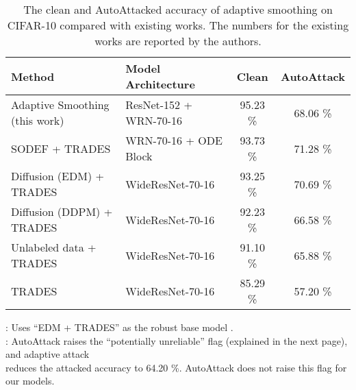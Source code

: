 \documentclass[11pt, letterpaper]{article}
\theoremstyle{plain}
\theoremstyle{definition}
\begin{document}
\begin{table}
\begin{center}
	\caption{The clean and AutoAttacked accuracy of adaptive smoothing on CIFAR-10 compared with existing works. The numbers for the existing works are reported by the authors.}
	\label{tab:compare_cifar10}
	\vspace{-1mm}

	\begin{small}
	\begin{tabular}{l|l!{\vrule width 2pt}c|c}
		\toprule
		Method & Model Architecture & Clean & AutoAttack \\
		\midrule
		Adaptive Smoothing (this work) 		& ResNet-152 + WRN-70-16		& 95.23 \% & 68.06 \% \\
		\midrule
		SODEF + TRADES \citep{Kang21}				& WRN-70-16	+ ODE Block		& 93.73 \% &  71.28 \%  \\
		Diffusion (EDM) + TRADES \citep{Wang23}		& WideResNet-70-16			& 93.25 \% & 70.69 \% \\
		Diffusion (DDPM) + TRADES \citep{Rebuffi21}	& WideResNet-70-16			& 92.23 \% & 66.58 \% \\
		Unlabeled data + TRADES \citep{Gowal20}		& WideResNet-70-16			& 91.10 \% & 65.88 \% \\
		TRADES \citep{Gowal20}						& WideResNet-70-16			& 85.29 \% & 57.20 \% \\
		\bottomrule
	\end{tabular}
	\end{small}
\end{center}
\small{: Uses ``EDM + TRADES'' \citep{Wang23} as the robust base model . } \\
\small{: AutoAttack raises the ``potentially unreliable'' flag (explained in the next page), and adaptive attack} \\
\small{ reduces the attacked accuracy to 64.20 \%. AutoAttack does not raise this flag for our models.}
\end{table}
\end{document}
